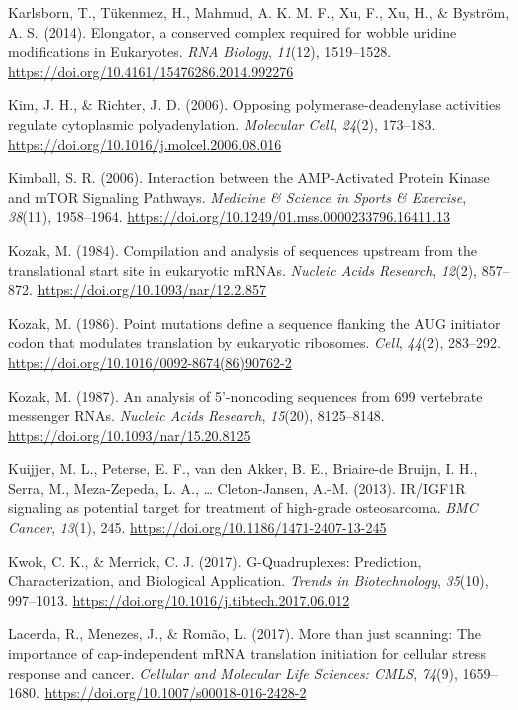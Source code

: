 \documentclass[12pt,openany]{book}
\begin{document}
\hypertarget{ref-Karlsborn2014}{}
Karlsborn, T., Tükenmez, H., Mahmud, A. K. M. F., Xu, F., Xu, H., \&
Byström, A. S. (2014). Elongator, a conserved complex required for
wobble uridine modifications in Eukaryotes. \emph{RNA Biology},
\emph{11}(12), 1519--1528.
\url{https://doi.org/10.4161/15476286.2014.992276}

\hypertarget{ref-Kim2006}{}
Kim, J. H., \& Richter, J. D. (2006). Opposing polymerase-deadenylase
activities regulate cytoplasmic polyadenylation. \emph{Molecular Cell},
\emph{24}(2), 173--183.
\url{https://doi.org/10.1016/j.molcel.2006.08.016}

\hypertarget{ref-Kimball2006}{}
Kimball, S. R. (2006). Interaction between the AMP-Activated Protein
Kinase and mTOR Signaling Pathways. \emph{Medicine \& Science in Sports
\& Exercise}, \emph{38}(11), 1958--1964.
\url{https://doi.org/10.1249/01.mss.0000233796.16411.13}

\hypertarget{ref-Kozak1984}{}
Kozak, M. (1984). Compilation and analysis of sequences upstream from
the translational start site in eukaryotic mRNAs. \emph{Nucleic Acids
Research}, \emph{12}(2), 857--872.
\url{https://doi.org/10.1093/nar/12.2.857}

\hypertarget{ref-Kozak1986}{}
Kozak, M. (1986). Point mutations define a sequence flanking the AUG
initiator codon that modulates translation by eukaryotic ribosomes.
\emph{Cell}, \emph{44}(2), 283--292.
\url{https://doi.org/10.1016/0092-8674(86)90762-2}

\hypertarget{ref-Kozak1987}{}
Kozak, M. (1987). An analysis of 5'-noncoding sequences from 699
vertebrate messenger RNAs. \emph{Nucleic Acids Research}, \emph{15}(20),
8125--8148. \url{https://doi.org/10.1093/nar/15.20.8125}

\hypertarget{ref-Kuijjer2013}{}
Kuijjer, M. L., Peterse, E. F., van den Akker, B. E., Briaire-de Bruijn,
I. H., Serra, M., Meza-Zepeda, L. A., \ldots{} Cleton-Jansen, A.-M.
(2013). IR/IGF1R signaling as potential target for treatment of
high-grade osteosarcoma. \emph{BMC Cancer}, \emph{13}(1), 245.
\url{https://doi.org/10.1186/1471-2407-13-245}

\hypertarget{ref-Kwok2017}{}
Kwok, C. K., \& Merrick, C. J. (2017). G-Quadruplexes: Prediction,
Characterization, and Biological Application. \emph{Trends in
Biotechnology}, \emph{35}(10), 997--1013.
\url{https://doi.org/10.1016/j.tibtech.2017.06.012}

\hypertarget{ref-Lacerda2017}{}
Lacerda, R., Menezes, J., \& Romão, L. (2017). More than just scanning:
The importance of cap-independent mRNA translation initiation for
cellular stress response and cancer. \emph{Cellular and Molecular Life
Sciences: CMLS}, \emph{74}(9), 1659--1680.
\url{https://doi.org/10.1007/s00018-016-2428-2}
\end{document}
